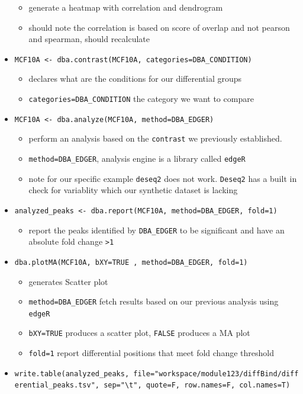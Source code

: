\documentclass[
]{book}
\providecommand{\tightlist}{%
  \setlength{\itemsep}{0pt}\setlength{\parskip}{0pt}}
\begin{document}
\begin{itemize}
  \begin{itemize}
  \tightlist
  \item
    generate a heatmap with correlation and dendrogram
  \item
    should note the correlation is based on score of overlap and not pearson and spearman, should recalculate
  \end{itemize}
\item
  \texttt{MCF10A\ \textless{}-\ dba.contrast(MCF10A,\ categories=DBA\_CONDITION)}

  \begin{itemize}
  \tightlist
  \item
    declares what are the conditions for our differential groups
  \item
    \texttt{categories=DBA\_CONDITION} the category we want to compare
  \end{itemize}
\item
  \texttt{MCF10A\ \textless{}-\ dba.analyze(MCF10A,\ method=DBA\_EDGER)}

  \begin{itemize}
  \tightlist
  \item
    perform an analysis based on the \texttt{contrast} we previously established.
  \item
    \texttt{method=DBA\_EDGER}, analysis engine is a library called \texttt{edgeR}
  \item
    note for our specific example \texttt{deseq2} does not work. \texttt{Deseq2} has a built in check for variablity which our synthetic dataset is lacking
  \end{itemize}
\item
  \texttt{analyzed\_peaks\ \textless{}-\ dba.report(MCF10A,\ method=DBA\_EDGER,\ fold=1)}

  \begin{itemize}
  \tightlist
  \item
    report the peaks identified by \texttt{DBA\_EDGER} to be significant and have an absolute fold change \texttt{\textgreater{}1}
  \end{itemize}
\item
  \texttt{dba.plotMA(MCF10A,\ bXY=TRUE\ ,\ method=DBA\_EDGER,\ fold=1)}

  \begin{itemize}
  \tightlist
  \item
    generates Scatter plot
  \item
    \texttt{method=DBA\_EDGER} fetch results based on our previous analysis using \texttt{edgeR}
  \item
    \texttt{bXY=TRUE} produces a scatter plot, \texttt{FALSE} produces a MA plot
  \item
    \texttt{fold=1} report differential positions that meet fold change threshold
  \end{itemize}
\item
  \texttt{write.table(analyzed\_peaks,\ file="workspace/module123/diffBind/differential\_peaks.tsv",\ sep="\textbackslash{}t",\ quote=F,\ row.names=F,\ col.names=T)}


\end{itemize}
\end{document}
